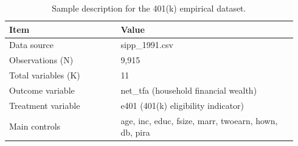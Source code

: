 \begin{table}[!htbp]
\centering
\caption{Sample description for the 401(k) empirical dataset.}
\label{tab:sample-401k}
\renewcommand{\arraystretch}{1.15}
\begin{tabular}{p{0.36\linewidth} p{0.58\linewidth}}
 \hline
Item & Value \\
 \hline
Data source & sipp\_1991.csv \\
Observations (N) & 9,915 \\
Total variables (K) & 11 \\
Outcome variable & net\_tfa (household financial wealth) \\
Treatment variable & e401 (401(k) eligibility indicator) \\
Main controls & age, inc, educ, fsize, marr, twoearn, hown, db, pira \\
 \hline
\end{tabular}
\end{table}
